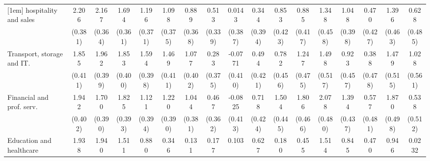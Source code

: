 {\begin{tabular}{l*{16}{c}}
[1em]
hospitality and sales&       2.206\sym{***}&       2.167\sym{***}&       1.694\sym{***}&       1.196\sym{**} &       1.098\sym{**} &       0.889\sym{*}  &       0.513         &      0.0143         &       0.344         &       0.853\sym{*}  &       0.885\sym{*}  &       1.348\sym{**} &       1.048\sym{**} &       0.470         &       1.396\sym{**} &       0.628         \\
                    &     (0.381)         &     (0.364)         &     (0.361)         &     (0.371)         &     (0.375)         &     (0.368)         &     (0.339)         &     (0.387)         &     (0.394)         &     (0.423)         &     (0.417)         &     (0.458)         &     (0.398)         &     (0.427)         &     (0.463)         &     (0.485)         \\
[1em]
Transport, storage and IT.&       1.855\sym{***}&       1.962\sym{***}&       1.853\sym{***}&       1.594\sym{***}&       1.469\sym{***}&       1.077\sym{**} &       0.283         &     -0.0771         &       0.494         &       0.782         &       1.247\sym{**} &       1.498\sym{**} &       0.923\sym{*}  &       0.388         &       1.479\sym{**} &       1.028         \\
                    &     (0.411)         &     (0.399)         &     (0.400)         &     (0.398)         &     (0.411)         &     (0.402)         &     (0.375)         &     (0.410)         &     (0.421)         &     (0.456)         &     (0.475)         &     (0.517)         &     (0.457)         &     (0.478)         &     (0.515)         &     (0.561)         \\
[1em]
Financial and prof. serv.&       1.942\sym{***}&       1.700\sym{***}&       1.825\sym{***}&       1.121\sym{**} &       1.220\sym{**} &       1.044\sym{**} &       0.467         &     -0.0825         &       0.718         &       1.504\sym{***}&       1.806\sym{***}&       2.078\sym{***}&       1.394\sym{**} &       0.577         &       1.870\sym{***}&       0.538         \\
                    &     (0.402)         &     (0.390)         &     (0.393)         &     (0.394)         &     (0.390)         &     (0.381)         &     (0.362)         &     (0.413)         &     (0.424)         &     (0.445)         &     (0.466)         &     (0.480)         &     (0.437)         &     (0.481)         &     (0.498)         &     (0.512)         \\
[1em]
Education and healthcare&       1.938\sym{***}&       1.940\sym{***}&       1.511\sym{**} &       0.880         &       0.346         &       0.131         &       0.177         &       0.103         &       0.627         &       0.180         &       0.455         &       1.514\sym{*}  &       0.845         &       0.470         &       0.946         &      0.0232         \\

\end{tabular}}
